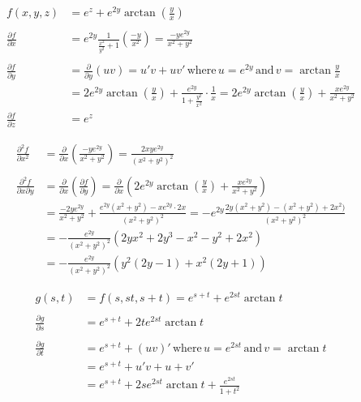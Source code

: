 \documentclass[a4paper,norsk,12pt]{article}
\begin{document}
\begin{align*}
  f(x,y,z) &= e^z + e^{2y}\arctan{\left(\frac{y}{x}\right)} \\
  \\
  \frac{\partial f}{\partial x} &=
    e^{2y}\frac{1}{\frac{x^2}{y^2}+1} \left(\frac{-y}{x^2}\right)
      = \frac{-ye^{2y}}{x^2+y^2} \\
  \\
    \frac{\partial f}{\partial y} &= \frac{\partial}{\partial y}(uv) =
    u'v+uv' \,\text{where}\, u=e^{2y} \,\text{and}\, v=\arctan{\frac{y}{x}}
    \\
    &= 2e^{2y}\arctan{\left(\frac{y}{x}\right)} + \frac{e^{2y}}{1+\frac{y^2}{x^2}}\cdot\frac{1}{x}
    = 2e^{2y}\arctan{\left(\frac{y}{x}\right)} + \frac{xe^{2y}}{x^2+y^2} \\
    \frac{\partial f}{\partial z} &= e^z
\end{align*}

\begin{align*}
  \frac{\partial^2 f}{\partial x^2} &=
  \frac{\partial}{\partial x} \left(\frac{-ye^{2y}}{x^2+y^2}\right)
    = \frac{2xye^{2y}}{(x^2+y^2)^2}
  \\
  \\
  \frac{\partial^2 f}{\partial x \partial y} &=
  \frac{\partial}{\partial x} \left(\frac{\partial f}{\partial y}\right) =
    \frac{\partial}{\partial x} \left( 
      2e^{2y}\arctan{\left(\frac{y}{x}\right)} + \frac{xe^{2y}}{x^2+y^2}
    \right)
    \\
    &= \frac{-2ye^{2y}}{x^2+y^2} + \frac{e^{2y}(x^2+y^2)-xe^{2y}\cdot2x}{(x^2+y^2)^2}
    = -e^{2y}\frac{2y(x^2+y^2) - (x^2+y^2) + 2x^2)}{(x^2+y^2)^2} \\
    &= -\frac{e^{2y}}{(x^2+y^2)^2}\left( 2yx^2 + 2y^3 -x^2 - y^2 + 2x^2 \right)
    \\
    &= -\frac{e^{2y}}{(x^2+y^2)^2}\left( y^2(2y-1) + x^2(2y+1) \right)
\end{align*}

\begin{align*}
  g(s,t) &= f(s, st, s+t) = e^{s+t} + e^{2st}\arctan{t} \\
  \\
  \frac{\partial g}{\partial s} &= e^{s+t} + 2te^{2st}\arctan{t} \\
  \\
  \frac{\partial g}{\partial t} &= e^{s+t} + (uv)' \,\text{where}\, u=e^{2st}
    \,\text{and}\, v=\arctan{t} \\
    &= e^{s+t} + u'v + u+v' \\
    &= e^{s+t} + 2se^{2st}\arctan{t} + \frac{e^{2st}}{1+t^2}
\end{align*}
\end{document}
